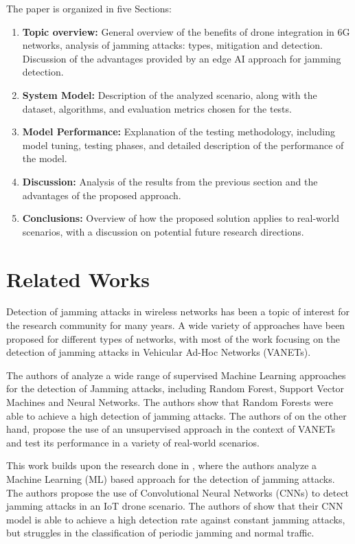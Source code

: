 \documentclass[futureinternet,article,submit,pdftex,moreauthors]{Definitions/mdpi}
\begin{document}
The paper is organized in five Sections: 
\begin{enumerate}
	\item \textbf{Topic overview:} General overview of the benefits of drone integration in 6G networks, analysis of jamming attacks: types, mitigation and detection. Discussion of the advantages provided by an edge AI approach for jamming detection. 
	\item \textbf{System Model:} Description of the analyzed scenario, along with the dataset, algorithms, and evaluation metrics chosen for the tests.
	\item \textbf{Model Performance:} Explanation of the testing methodology, including model tuning, testing phases, and detailed description of the performance of the model.
	\item \textbf{Discussion:} Analysis of the results from the previous section and the advantages of the proposed approach.
	\item \textbf{Conclusions:} Overview of how the proposed solution applies to real-world scenarios, with a discussion on potential future research directions.
\end{enumerate}

\section{Related Works}

Detection of jamming attacks in wireless networks has been a topic of interest for the research community for many years. A wide variety of approaches have been proposed for different types of networks, with most of the work focusing on the detection of jamming attacks in Vehicular Ad-Hoc Networks (VANETs)\cite{VANETsAI-Lyamin}.

The authors of \cite{JammingDetectionML-Arjoune} analyze a wide range of supervised Machine Learning approaches for the detection of Jamming attacks, including Random Forest, Support Vector Machines and Neural Networks. The authors show that Random Forests were able to achieve a high detection of jamming attacks. 
The authors of \cite{JammingDetectionRF-Karagiannis} on the other hand, propose the use of an unsupervised approach in the context of VANETs and test its performance in a variety of real-world scenarios. 

This work builds upon the research done in \cite{JammingDetectionIoT-Hussain}, where the authors analyze a Machine Learning (ML) based approach for the detection of jamming attacks. 
The authors propose the use of Convolutional Neural Networks (CNNs) to detect jamming attacks in an IoT drone scenario. The authors of \cite{JammingDetectionIoT-Hussain} show that their CNN model is able to achieve a high detection rate against constant jamming attacks, but
struggles in the classification of periodic jamming and normal traffic. 
\end{document}
